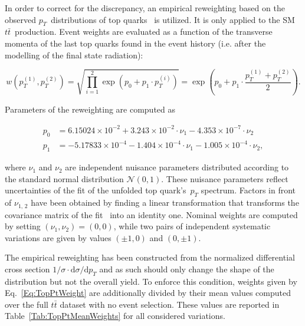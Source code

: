 In order to correct for the discrepancy, an empirical reweighting based on the observed $p_{T}$~distributions of top quarks~\cite{Wiki:TopPtReweighting} is utilized.
It is only applied to the SM $t\bar{t}$~production.
Event weights are evaluated as a function of the transverse momenta of the last top quarks found in the event history (i.e. after the modelling of the final state radiation):
\begin{linenomath}
\begin{equation}
 \label{Eq:TopPtWeight}
 w\!\left(p_{T}^{(1)}, p_{T}^{(2)}\right) = \sqrt{\prod_{i = 1}^2 \exp\!\left(p_0 + p_1 \cdot p_{T}^{(i)}\right)} = \exp\!\left(p_0 + p_1 \cdot \frac{p_{T}^{(1)} + p_{T}^{(2)}}{2}\right).
\end{equation}
\end{linenomath}
Parameters of the reweighting are computed as
\begin{linenomath}
\begin{equation}
 \label{Eq:TopPtWeightParams}
 \begin{aligned}
  p_0 &= 6.15024\times 10^{-2} + 3.243 \times 10^{-2} \cdot \nu_1 - 4.353\times 10^{-7} \cdot \nu_2 \\
  p_1 &= -5.17833\times 10^{-4} - 1.404\times 10^{-4} \cdot \nu_1 - 1.005\times 10^{-4} \cdot \nu_2,
 \end{aligned}
\end{equation}
\end{linenomath}
where $\nu_1$ and $\nu_2$ are independent nuisance parameters distributed according to the standard normal distribution $\mathcal N(0, 1)$.
These nuisance parameters reflect uncertainties of the fit of the unfolded top quark's~$p_{T}$ spectrum.
Factors in front of $\nu_{1,\,2}$ have been obtained by finding a linear transformation that transforms the covariance matrix of the fit~\cite{HN:TopPtCovariance} into an identity one.
Nominal weights are computed by setting $(\nu_1, \nu_2) = (0, 0)$, while two pairs of independent systematic variations are given by values $(\pm 1, 0)$ and $(0, \pm 1)$.

The empirical reweighting has been constructed from the normalized differential cross section $1/\sigma \cdot \mathrm d\sigma / \mathrm dp_{T}$ and as such should only change the shape of the distribution but not the overall yield.
To enforce this condition, weights given by Eq.~\ref{Eq:TopPtWeight} are additionally divided by their mean values computed over the full $t\bar t$ dataset with no event selection.
These values are reported in Table~\ref{Tab:TopPtMeanWeights} for all considered variations.

